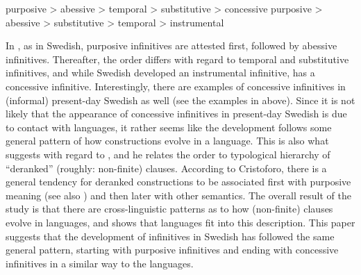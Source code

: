 \documentclass[output=paper]{langscibook}
\begin{document}
\ea
\label{ex:kalm:31}
purposive > abessive > temporal > substitutive > concessive
\ex
\label{ex:kalm:32}
purposive > abessive > substitutive > temporal > instrumental
\z

In , as in Swedish, purposive infinitives are attested first, followed by abessive infinitives. Thereafter, the order differs with regard to temporal and substitutive infinitives, and while Swedish developed an instrumental infinitive,  has a concessive infinitive. Interestingly, there are examples of concessive infinitives in (informal) present-day Swedish as well (see the examples in  above). Since it is not likely that the appearance of concessive infinitives in present-day Swedish is due to contact with  languages, it rather seems like the development follows some general pattern of how  constructions evolve in a language. This is also what \citet{Schulte2007Prepositional, Schulte2007What} suggests with regard to , and he relates the order to  typological hierarchy of “deranked” (roughly: non-finite)  clauses. According to Cristoforo, there is a general tendency for deranked constructions to be associated first with purposive meaning (see also \citealt{Haspelmath1989}) and then later with other semantics. The overall result of the study is that there are cross-linguistic patterns as to how  (non-finite) clauses evolve in languages, and \citet{Schulte2007Prepositional, Schulte2007What} shows that  languages fit into this description. This paper suggests that the development of  infinitives in Swedish has followed the same general pattern, starting with purposive infinitives and ending with concessive infinitives in a similar way to the  languages.
\end{document}
